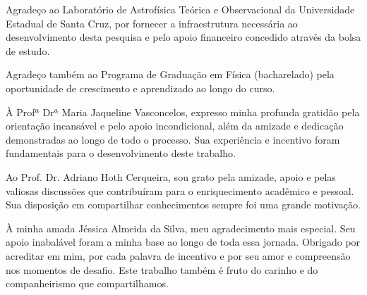 %
\pagestyle{empty}

\begin{agradecimentos}

\begin{incisos}
\item Agradeço ao Laboratório de Astrofísica Teórica e Observacional da Universidade Estadual de Santa Cruz, por fornecer a infraestrutura necessária ao desenvolvimento desta pesquisa e pelo apoio financeiro concedido através da bolsa de estudo.

\item Agradeço também ao Programa de Graduação em Física (bacharelado) pela oportunidade de crescimento e aprendizado ao longo do curso.

\item À Profª Drª Maria Jaqueline Vasconcelos, expresso minha profunda gratidão pela orientação incansável e pelo apoio incondicional, além da amizade e dedicação demonstradas ao longo de todo o processo. Sua experiência e incentivo foram fundamentais para o desenvolvimento deste trabalho.

\item Ao Prof. Dr. Adriano Hoth Cerqueira, sou grato pela amizade, apoio e pelas valiosas discussões que contribuíram para o enriquecimento acadêmico e pessoal. Sua disposição em compartilhar conhecimentos sempre foi uma grande motivação.

\item À minha amada Jéssica Almeida da Silva, meu agradecimento mais especial. Seu apoio inabalável foram a minha base ao longo de toda essa jornada. Obrigado por acreditar em mim, por cada palavra de incentivo e por seu amor e compreensão nos momentos de desafio. Este trabalho também é fruto do carinho e do companheirismo que compartilhamos. 
\end{incisos}

\end{agradecimentos}
